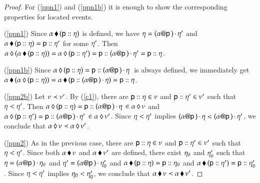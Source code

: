 \begin{proof}
 For (\ref{ppn1}) and (\ref{ppn1b})  it  is enough to show
  the corresponding properties for
  located events.
  
  (\ref{ppn1}) Since ${\alpha}\,\blacklozenge\,{({\sf p}:: \eta)}$ is defined,
  we have $\eta=(\alpha @ {\sf p}\,)\,{\cdot}\,\eta'$ and
  ${\alpha}\,\blacklozenge\,{({\sf p}:: \eta)}= {\sf p}:: \eta'$ for some
  $\eta'$. Then ${\alpha}\,\lozenge\,{( {\alpha}\,\blacklozenge\,{({\sf p}:: \eta)})} =
  {\alpha}\,\lozenge\,{({\sf p}:: \eta')}=
  {\sf p}:: (\alpha @ {\sf p}\,)\,{\cdot}\,\eta'=
  {\sf p}:: \eta$.
 
 
  (\ref{ppn1b}) Since
  ${\alpha}\,\lozenge\,{({\sf p}:: \eta)}={\sf p}:: (\alpha @ {\sf p}\,)\,{\cdot}\,\eta
  \,$ is always defined, we immediately get $
  {\alpha}\,\blacklozenge\,{({\alpha}\,\lozenge\,{({\sf p}:: \eta)})} =
  {\alpha}\,\blacklozenge\,{({\sf p}:: (\alpha @ {\sf p}\,)\,{\cdot}\,\eta)} =
  {\sf p}:: \eta$.
 
  (\ref{ppn2b}) Let $\nu\prec \nu'$. By
  (\ref{c1}), there are
  ${\sf p}:: \eta\in\nu$ and ${\sf p}:: \eta'\in\nu'$
  such that $\eta<\eta'$.  Then
  ${\alpha}\,\lozenge\,{({\sf p}:: \eta)}={\sf p}:: (\alpha @ {\sf p}\,)\,{\cdot}\,\eta
  \, \in {\alpha}\,\lozenge\,{\nu}$ and
  ${\alpha}\,\lozenge\,{({\sf p}:: \eta')}={\sf p}:: (\alpha @ {\sf p}\,)\,{\cdot}\,\eta'
  \, \in {\alpha}\,\lozenge\,{\nu'}$. Since $\eta<\eta'$ implies
  $(\alpha @ {\sf p}\,)\,{\cdot}\,\eta <
  (\alpha @ {\sf p}\,)\,{\cdot}\,\eta'$, we conclude that
  ${\alpha}\,\lozenge\,{\nu}\prec {\alpha}\,\lozenge\,{\nu'}$.

  (\ref{ppn2}) %
As in the previous case,
there are ${\sf p}:: \eta\in\nu$ and
${\sf p}:: \eta'\in\nu'$ such that $\eta<\eta'$.  Since
both ${\alpha}\,\blacklozenge\,{\nu}$ and ${\alpha}\,\blacklozenge\,{\nu'}$ are defined,
there exist $\eta_0$ and $\eta'_0$ such that
$\eta=(\alpha @ {\sf p}\,)\,{\cdot}\,\eta_0$ and $\eta'
=(\alpha @ {\sf p}\,)\,{\cdot}\,\eta'_0$ and
${\alpha}\,\blacklozenge\,{({\sf p}:: \eta)}= {\sf p}:: \eta_0$ and
${\alpha}\,\blacklozenge\,{({\sf p}:: \eta')}= {\sf p}:: \eta'_0$. Since
$\eta<\eta'$ implies $\eta_0<\eta'_0$,
we conclude that ${\alpha}\,\blacklozenge\,{\nu}\prec {\alpha}\,\blacklozenge\,{\nu'}$.


\end{proof}
